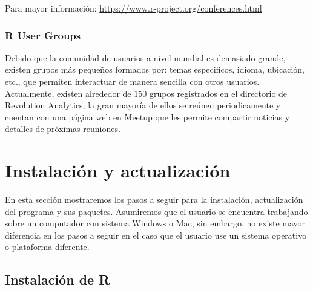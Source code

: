 \documentclass[11pt,a4paper,oneside]{book}\usepackage[]{graphicx}\usepackage[]{color}
\begin{document}
Para mayor información: \url{https://www.r-project.org/conferences.html}

\subsection{R User Groups}

Debido que la comunidad de usuarios a nivel mundial es demasiado grande, existen grupos más pequeños formados por: temas especificos, idioma, ubicación, etc., que permiten interactuar de manera sencilla con otros usuarios. Actualmente, existen alrededor de $150$ grupos registrados en el directorio de Revolution Analytics, la gran mayoría de ellos se reúnen periodicamente y cuentan con una página web en Meetup que les permite compartir noticias y detalles de próximas reuniones.




\chapter{Instalación y actualización}

En esta sección mostraremos los pasos a seguir para la instalación, actualización del programa y sus paquetes. Asumiremos que el usuario se encuentra trabajando sobre un computador con sistema Windows o Mac, sin embargo, no existe mayor diferencia en los pasos a seguir en el caso que el usuario use un sistema operativo o plataforma diferente.

\section{Instalación de R}
\end{document}
